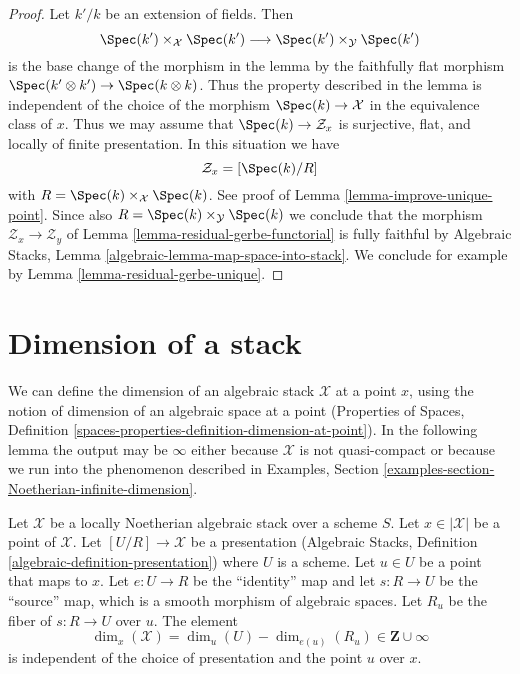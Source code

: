 \begin{proof}
Let $k'/k$ be an extension of fields. Then
$$
\Spec(k') \times_\mathcal{X} \Spec(k')
\longrightarrow
\Spec(k') \times_\mathcal{Y} \Spec(k')
$$
is the base change of the morphism in the lemma by the
faithfully flat morphism $\Spec(k' \otimes k') \to \Spec(k \otimes k)$.
Thus the property described in the lemma is independent of the
choice of the morphism $\Spec(k) \to \mathcal{X}$ in the
equivalence class of $x$. Thus we may assume that
$\Spec(k) \to \mathcal{Z}_x$ is surjective, flat, and
locally of finite presentation. In this situation we have
$$
\mathcal{Z}_x = [\Spec(k)/R]
$$
with $R = \Spec(k) \times_\mathcal{X} \Spec(k)$. See
proof of Lemma \ref{lemma-improve-unique-point}.
Since also $R = \Spec(k) \times_\mathcal{Y} \Spec(k)$
we conclude that the morphism $\mathcal{Z}_x \to \mathcal{Z}_y$
of Lemma \ref{lemma-residual-gerbe-functorial}
is fully faithful by
Algebraic Stacks, Lemma \ref{algebraic-lemma-map-space-into-stack}.
We conclude for example by Lemma \ref{lemma-residual-gerbe-unique}.
\end{proof}








\section{Dimension of a stack}
\label{section-dimension}

\noindent
We can define the dimension of an algebraic stack $\mathcal{X}$
at a point $x$, using the notion of dimension of an algebraic space
at a point (Properties of Spaces, Definition
\ref{spaces-properties-definition-dimension-at-point}).
In the following lemma the output may be $\infty$ either because
$\mathcal{X}$ is not quasi-compact or because we run into the
phenomenon described in Examples, Section
\ref{examples-section-Noetherian-infinite-dimension}.

\begin{lemma}
\label{lemma-dimension-at-point-well-defined}
Let $\mathcal{X}$ be a locally Noetherian algebraic stack over a scheme $S$.
Let $x \in |\mathcal{X}|$ be a point of $\mathcal{X}$.
Let $[U/R] \to \mathcal{X}$ be a presentation
(Algebraic Stacks, Definition \ref{algebraic-definition-presentation})
where $U$ is a scheme. Let $u \in U$ be a point that maps to $x$.
Let $e : U \to R$ be the ``identity'' map and let $s : R \to U$ be the
``source'' map, which is a smooth morphism of algebraic spaces. Let $R_u$
be the fiber of $s : R \to U$ over $u$. The element
$$
\dim_x(\mathcal{X}) = \dim_u(U) - \dim_{e(u)}(R_u) \in \mathbf{Z} \cup \infty
$$
is independent of the choice of presentation and the point $u$ over $x$.
\end{lemma}

